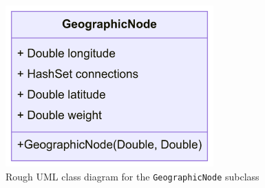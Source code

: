 \documentclass[11pt,twoside,a4paper]{article}
\begin{document}
\begin{figure}[t]
    \begin{center}
        \includegraphics[width=8cm]{GeographicNode.png}
    \end{center}
    \caption{Rough UML class diagram for the \texttt{GeographicNode} subclass}
    \label{geographicnode}
\end{figure}
\end{document}
